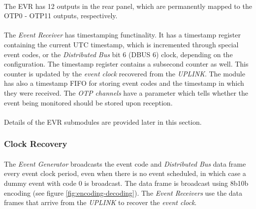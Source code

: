 \documentclass[openany]{article}
\begin{document}
		\paragraph{} The EVR has 12 outputs in the rear panel, which are permanently mapped to the OTP0 - OTP11 outputs, respectively.
		\paragraph{} The \emph{Event Receiver} has timestamping functinality. It has a timestamp register containing the current UTC timestamp, which is incremented through special event codes, or the \emph{Distributed Bus} bit 6 (DBUS 6) clock, depending on the configuration. The timestamp register contains a subsecond counter as well. This counter is updated by the \emph{event clock} recovered from the \emph{UPLINK}. The module has also a timestamp FIFO for storing event codes and the timestamp in which they were received. The \emph{OTP channels} have a parameter which tells whether the event being monitored should be stored upon reception.
		\paragraph{} Details of the EVR submodules are provided later in this section.

		\subsubsection{Clock Recovery}\label{sec:evr-clock-recovery}

			\paragraph{} The \emph{Event Generator} broadcasts the event code and \emph{Distributed Bus} data frame every event clock period, even when there is no event scheduled, in which case a dummy event with code 0 is broadcast. The data frame is broadcast using 8b10b encoding (see figure \ref{fig:encoding-decoding}). The \emph{Event Receivers} use the data frames that arrive from the \emph{UPLINK} to recover the \emph{event clock}.
\end{document}
